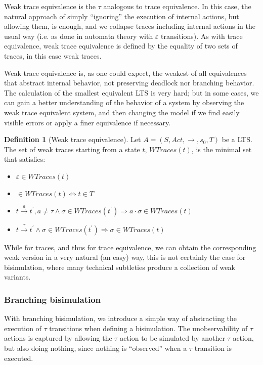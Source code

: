 \documentclass[11pt]{article}
\newcommand{\cmark}{\ding{51}}
\theoremstyle{definition}
\newtheorem{definition}{Definition}
\theoremstyle{plain}
\renewcommand{\epsilon}{\varepsilon}
\begin{document}
Weak trace equivalence is the $ \tau $ analogous to trace equivalence. In this case, the natural approach of simply ``ignoring'' the execution of internal actions, but allowing them, is enough, and we collapse traces including internal actions in the usual way (i.e. as done in automata theory with $ \epsilon $ transitions). As with trace equivalence, weak trace equivalence is defined by the equality of two sets of traces, in this case weak traces.

Weak trace equivalence is, as one could expect, the weakest of all equivalences that abstract internal behavior, not preserving deadlock nor branching behavior. The calculation of the smallest equivalent LTS is very hard; but in some cases, we can gain a better understanding of the behavior of a system by observing the weak trace equivalent system, and then changing the model if we find easily visible errors or apply a finer equivalence if necessary.

\begin{definition} [Weak trace equivalence]
	Let $ A = (S, Act, \rightarrow, s_0, T) $ be a LTS. The set of weak traces starting from a state $ t $, $ WTraces(t) $, is the minimal set that satisfies:
	\begin{itemize}
		\item $ \varepsilon \in WTraces(t) $
		\item \cmark $ \in WTraces(t) \iff t \in T $
		\item $ t\xrightarrow{a}t^\prime , a\not = \tau \wedge \sigma \in WTraces(t^\prime ) \Rightarrow a\cdot\sigma \in WTraces(t) $
		\item $ t\xrightarrow{\tau}t^\prime  \wedge \sigma \in WTraces(t^\prime ) \Rightarrow \sigma \in WTraces(t) $
	\end{itemize}
\end{definition}

While for traces, and thus for trace equivalence, we can obtain the corresponding weak version in a very natural (an easy) way, this is not certainly the case for bisimulation, where many technical subtleties produce a collection of weak variants.

\subsubsection{Branching bisimulation}
With branching bisimulation, we introduce a simple way of abstracting the execution of $ \tau $ transitions when defining a bisimulation. The unobservability of  $ \tau $ actions is captured by allowing the $ \tau $ action to be simulated by another $ \tau $ action, but also doing nothing, since nothing is ``observed'' when a $ \tau $ transition is executed.
\end{document}
